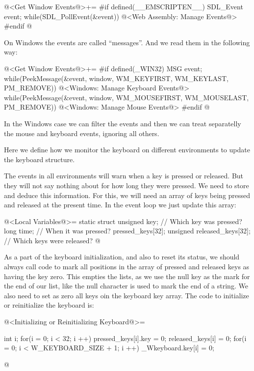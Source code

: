 \iniciocodigo
@<Get Window Events@>+=
#if defined(__EMSCRIPTEN__)
SDL_Event event;
while(SDL_PollEvent(&event)){
  @<Web Assembly: Manage Events@>
}
#endif
@
\fimcodigo

On Windows the events are called ``messages''. And we read them in the
following way:

\iniciocodigo
@<Get Window Events@>+=
#if defined(_WIN32)
MSG event;
while(PeekMessage(&event, window, WM_KEYFIRST, WM_KEYLAST, PM_REMOVE)){
  @<Windows: Manage Keyboard Events@>
}
while(PeekMessage(&event, window, WM_MOUSEFIRST, WM_MOUSELAST, PM_REMOVE)){
  @<Windows: Manage Mouse Events@>
}
#endif
@
\fimcodigo

In the Windows case we can filter the events and then we can treat
separatelly the mouse and keyboard events, ignoring all others.


Here we define how we monitor the keyboard on different environments
to update the keyboard structure.

The events in all environments will warn when a key is pressed or
released. But they will not say nothing about for how long they were
pressed. We need to store and deduce this information. For this, we
will need an array of keys being pressed and released at the present
time. In the event loop we just update this array:

\iniciocodigo
@<Local Variables@>=
static struct{
  unsigned key; // Which key was pressed?
  long time;    // When it was pressed?
} pressed_keys[32];
unsigned released_keys[32]; // Which keys were released?
@
\fimcodigo

As a part of the keyboard initialization, and also to reset its
status, we should always call code to mark all positions in the array
of pressed and released keys as having the key zero. This empties the
lists, as we use the null key as the mark for the end of our list,
like the null character is used to mark the end of a string. We also
need to set as zero all keys oin the keyboard key array. The code to
initialize or reinitialize the keyboard is:

\iniciocodigo
@<Initializing or Reinitializing Keyboard@>=
{
  int i;
  for(i = 0; i < 32; i ++){
    pressed_keys[i].key = 0;
    released_keys[i] = 0;
  }
  for(i = 0; i < W_KEYBOARD_SIZE + 1; i ++)
    _Wkeyboard.key[i] = 0;

}
@
\fimcodigo


